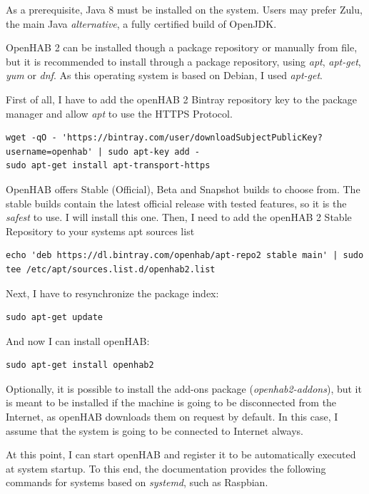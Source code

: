 As a prerequisite, Java 8 must be installed on the system. Users may prefer Zulu, the main Java \textit{alternative}, a fully 
certified build of OpenJDK.\cite{zuluWebsite}

OpenHAB 2 can be installed though a package repository or manually from file, but it is recommended to install through a package
repository, using \textit{apt}, \textit{apt-get}, \textit{yum} or \textit{dnf}. As this operating system is based on Debian, I used 
\textit{apt-get}.

First of all, I have to add the openHAB 2 Bintray repository key to the package manager and allow \textit{apt} to use the HTTPS 
Protocol.

\begin{lstlisting}[style=Consola]
wget -qO - 'https://bintray.com/user/downloadSubjectPublicKey?username=openhab' | sudo apt-key add - 
sudo apt-get install apt-transport-https
\end{lstlisting}

OpenHAB offers Stable (Official), Beta and Snapshot builds to choose from. The stable builds contain the latest official release 
with tested features, so it is the \textit{safest} to use. I will install this one. Then, I need to add the openHAB 2 Stable Repository 
to your systems apt sources list

\begin{lstlisting}[style=Consola]
echo 'deb https://dl.bintray.com/openhab/apt-repo2 stable main' | sudo tee /etc/apt/sources.list.d/openhab2.list
\end{lstlisting}

Next, I have to resynchronize the package index:

\begin{lstlisting}[style=Consola]
sudo apt-get update
\end{lstlisting}

And now I can install openHAB:

\begin{lstlisting}[style=Consola]
sudo apt-get install openhab2
\end{lstlisting}

Optionally, it is possible to install the add-ons package (\textit{openhab2-addons}), but it is meant to be installed if the machine 
is going to be disconnected from the Internet, as openHAB downloads them on request by default. In this case, I assume that the
system is going to be connected to Internet always.

At this point, I can start openHAB and register it to be automatically executed at system startup. To this end, the documentation 
provides the following commands for systems based on \textit{systemd}, such as Raspbian.

